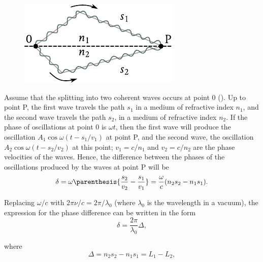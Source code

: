 \begin{figure}[!htb]
	\begin{center}
		\includegraphics[scale=1]{figures/ch_17/fig_17_1.pdf}
		\caption[]{}
		\label{fig:17_1}
	\end{center}
	\vspace{-0.8cm}
\end{figure}

Assume that the splitting into two coherent waves occurs at point $0$ ().
Up to point P, the first wave travels the path $s_1$ in a medium of refractive index $n_1$, and the second wave travels the path $s_2$, in a medium of refractive index $n_2$.
If the phase of oscillations at point $0$ is $\omega t$, then the first wave will produce the oscillation $A_1\cos\omega(t-s_1/v_1)$ at point P, and the second wave, the oscillation $A_2\cos\omega(t-s_2/v_2)$ at this point; $v_1=c/n_1$ and $v_2=c/n_2$ are the phase velocities of the waves.
Hence, the difference between the phases of the oscillations produced by the waves at point P will be
\begin{equation*}
    \delta = \omega \parenthesis{\frac{s_2}{v_2} - \frac{s_1}{v_1}} = \frac{\omega}{c} (n_2 s_2 - n_1 s_1).
\end{equation*}

\noindent
Replacing $\omega/c$ with $2\pi\nu/c = 2\pi/\lambda_0$ (where $\lambda_0$ is the wavelength in
a vacuum), the expression for the phase difference can be written in the form
\begin{equation}\label{eq:17_3}
    \delta = \frac{2 \pi}{\lambda_0} \Delta,
\end{equation}

\noindent
where
\begin{equation}\label{eq:17_4}
    \Delta = n_2 s_2 - n_1 s_1 = L_1 - L_2,
\end{equation}

